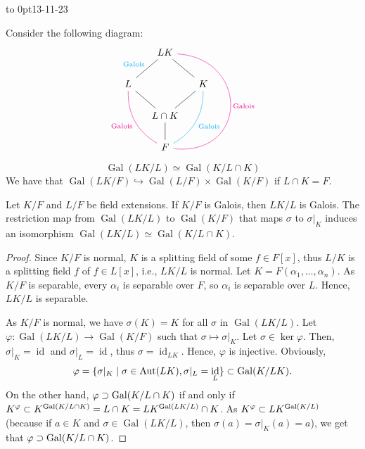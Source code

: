 \documentclass[twoside]{article}
\let\Im=\relax
\DeclareMathOperator\Aut{Aut}
\DeclareMathOperator\Gal{Gal}
\DeclareMathOperator\id{id}
\DeclareMathOperator\Im{Im}
\theoremstyle{remark}
\newcommand*\newclass[1]{\par\vbox to 0pt{\hbox{\tiny\sffamily\color{gray}#1}} \par\ignorespaces}
\begin{document}
\newclass{13-11-23}

Consider the following diagram:
\begin{displaymath}
  \begin{tikzcd}[column sep=small]
    & LK\dlar[dash,"\text{\color{cyan}Galois}"swap]\drar[dash]\ar[ddd,controls={+(3cm,-.2cm) and +(3cm,-.3cm)},"\text{Galois}",dash,magenta] \\
    L\drar[dash]\ar[ddr,bend right,"\text{Galois}"swap,dash,magenta] && K\dlar[dash]\ar[ddl,bend left,"\text{Galois}",dash,cyan] \\
    & L \cap K\dar[dash] \\
    & F
  \end{tikzcd}
\end{displaymath}
\[ \Gal(LK/L) \simeq \Gal(K/L \cap K) \]
We have that \(\Gal(LK/F) \hookrightarrow \Gal(L/F) \times \Gal(K/F)\) if \(L \cap K = F\).

\begin{proposition}
  Let \(K/F\) and \(L/F\) be field extensions. If \(K/F\) is Galois, then \(LK/L\) is Galois. The restriction map from \(\Gal(LK/L)\) to \(\Gal(K/F)\) that maps \(\sigma\) to \(\sigma|_K\) induces an isomorphism \(\Gal(LK/L) \simeq \Gal(K/L\cap K)\).
\end{proposition}

\begin{proof}
  Since \(K/F\) is normal, \(K\) is a splitting field of some \(f \in F[x]\), thus \(L/K\) is a splitting field \(f\) of \(f \in L[x]\), i.e., \(LK/L\) is normal. Let \(K = F(\alpha_1, \dots, \alpha_n)\). As \(K/F\) is separable, every \(\alpha_i\) is separable over \(F\), so \(\alpha_i\) is separable over \(L\). Hence, \(LK/L\) is separable.
  
  As \(K/F\) is normal, we have \(\sigma(K) = K\) for all \(\sigma\) in \(\Gal(LK/L)\). Let \(\varphi\colon \Gal(LK/L) \to \Gal(K/F)\) such that \(\sigma \mapsto \sigma|_K\). Let \(\sigma \in \ker\varphi\). Then, \(\sigma|_K = \id\) and \(\sigma|_L = \id\), thus \(\sigma = \id_{LK}\). Hence, \(\varphi\) is injective. Obviously,
  \[ \Im \varphi = \{\sigma|_K \mid \sigma \in \Aut(LK), \sigma|_L = \id_L\} \subset \Gal(K/LK). \]
  On the other hand, \(\Im\varphi \supset \Gal(K/L \cap K)\) if and only if \(K^{\Im\varphi} \subset K^{\Gal(K/L\cap K)} = L\cap K = LK^{\Gal(LK/L)} \cap K\). As \(K^{\Im\varphi} \subset LK^{\Gal(K/L)}\) (because if \(a \in K\) and \(\sigma \in \Gal(LK/L)\), then \(\sigma(a) = \sigma|_K(a) = a\)), we get that \(\Im\varphi \supset \Gal(K/L \cap K)\).
\end{proof}
\end{document}
